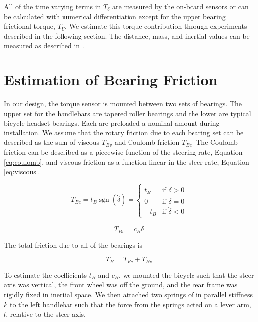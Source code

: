 \documentclass[a4paper]{article}
\begin{document}
All of the time varying terms in $T_\delta$ are measured by the on-board
sensors or can be calculated with numerical differentiation except for the
upper bearing frictional torque, $T_U$. We estimate this torque contribution
through experiments described in the following section. The distance, mass, and
inertial values can be measured as described in \cite{Moore2012}.

\section*{Estimation of Bearing Friction}
\label{sec:bearing-friction}

In our design, the torque sensor is mounted between two sets of bearings. The
upper set for the handlebars are tapered roller bearings and the lower are
typical bicycle headset bearings. Each are preloaded a nominal amount during
installation. We assume that the rotary friction due to each bearing set can be
described as the sum of viscous $T_{Bv}$ and Coulomb friction $T_{Bc}$. The
Coulomb friction can be described as a piecewise function of the steering rate,
Equation \ref{eq:coulomb}, and viscous friction as a function linear in the
steer rate, Equation \ref{eq:viscous}.

\begin{equation}
  T_{Bc} = t_B \operatorname{sgn}(\dot\delta) =
  \begin{cases}
    t_B  & \textrm{if $\dot{\delta}>0$}\\
    0    & \textrm{if $\dot{\delta}=0$}\\
    -t_B & \textrm{if $\dot{\delta}<0$}
  \end{cases}
  \label{eq:coulomb}
\end{equation}

\begin{equation}
  \label{eq:viscous}
  T_{Bv} = c_B \dot{\delta}
\end{equation}

The total friction due to all of the bearings is

\begin{equation}
  T_B = T_{Bc} + T_{Bv}
\end{equation}

To estimate the coefficients $t_B$ and $c_B$, we mounted the bicycle such that
the steer axis was vertical, the front wheel was off the ground, and the rear
frame was rigidly fixed in inertial space. We then attached two springs of in
parallel stiffness $k$ to the left handlebar such that the force from the
springs acted on a lever arm, $l$, relative to the steer axis.
\end{document}
